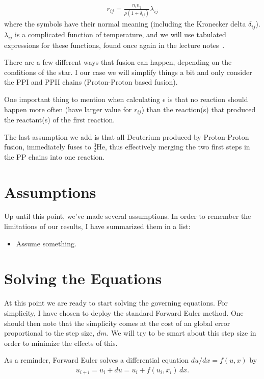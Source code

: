 \documentclass[11pt,twocolumn]{article}
\begin{document}
\begin{align}
  r_{ij} = \frac{n_in_j}{\rho(1+\delta_{ij})}\lambda_{ij}
\end{align}
where the symbols have their normal meaning (including the Kronecker
delta $\delta_{ij}$). $\lambda_{ij}$ is a complicated function of
temperature, and we will use tabulated expressions for these
functions, found once again in the lecture notes~\cite[Table
3.1]{lecture-notes}. 


There are a few different ways that fusion can happen, depending
on the conditions of the star. I our case we will simplify things a
bit and only consider the PPI and PPII chains (Proton-Proton based
fusion). 

One important thing to mention when calculating $\epsilon$ is that no
reaction should happen more often (have larger value for $r_{ij}$)
than the reaction(s) that produced the reactant(s) of the first
reaction. 

The last assumption we add is that all Deuterium produced by
Proton-Proton fusion, immediately fuses to $^3_2\text{He}$, thus
effectively merging the two first steps in the PP chains into one
reaction.


\section{Assumptions}
Up until this point, we've made several assumptions. In order to
remember the limitations of our results, I have summarized them in a
list:

\begin{itemize}
  \item Assume something.
\end{itemize}


\section{Solving the Equations}
At this point we are ready to start solving the governing
equations. For simplicity, I have chosen to deploy the standard
Forward Euler method. One should then note that the simplicity comes
at the cost of an global error proportional to the step size, $dm$. We
will try to be smart about this step size in order to minimize the
effects of this. 

As a reminder, Forward Euler solves a differential equation $du/dx =
f(u,x)$ by 
\begin{align*}
  u_{i+i} = u_i + du = u_i + f(u_i,x_i)\,dx.
\end{align*}
\end{document}
